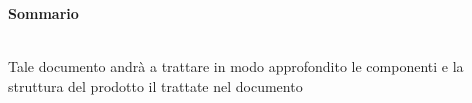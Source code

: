 \noindent\begin{Large}\textbf{Sommario}\end{Large}\\
\noindent Tale documento andrà a trattare in modo approfondito le componenti e la struttura del prodotto il \progetto trattate nel documento \SpecificaTecnica\\

